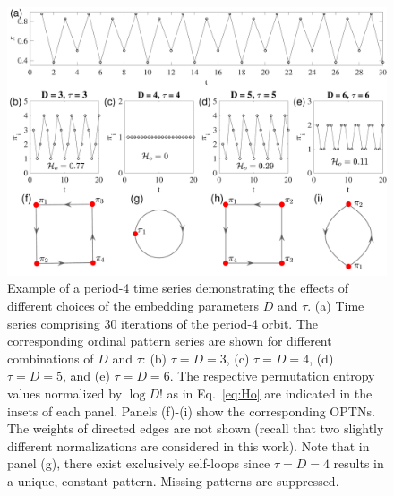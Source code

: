 \documentclass[aip,cha,reprint,nofootinbib]{revtex4-1}
\begin{document}
\begin{figure}
	\centering 
	\includegraphics[width=2\columnwidth]{period4_logisticExample.pdf}
\caption{\small{Example of a period-4 time series demonstrating the effects of different choices of the embedding parameters $D$ and $\tau$. (a) Time series comprising 30 iterations of the period-4 orbit. The corresponding ordinal pattern series are shown for different combinations of $D$ and $\tau$: (b) $\tau = D = 3$, (c) $\tau = D = 4$, (d) $ \tau = D = 5$, and (e) $\tau = D = 6$. The respective permutation entropy values normalized by $\log D!$ as in Eq.~\eqref{eq:Ho} are indicated in the insets of each panel. Panels (f)-(i) show the corresponding OPTNs. The weights of directed edges are not shown (recall that two slightly different normalizations are considered in this work). Note that in panel (g), there exist exclusively self-loops since $\tau = D = 4$ results in a unique, constant pattern. Missing patterns are suppressed.}
\label{fig:embed}}
\end{figure}
\end{document}
